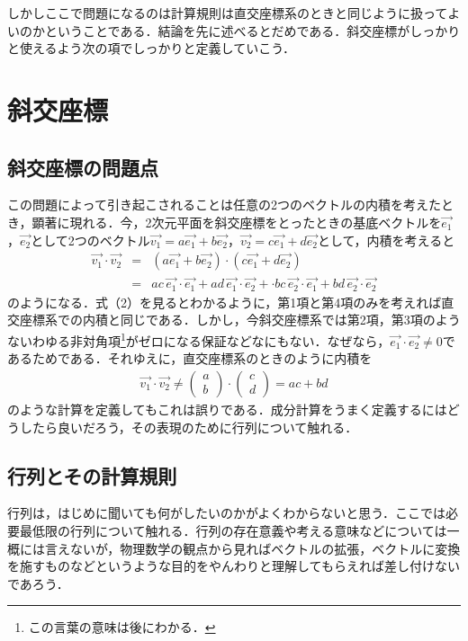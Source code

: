 \documentclass[dvipdfmx,a4]{jsarticle}
\begin{document}
しかしここで問題になるのは計算規則は直交座標系のときと同じように扱ってよいのかということである．結論を先に述べるとだめである．斜交座標がしっかりと使えるよう次の項でしっかりと定義していこう．

\section{斜交座標}
\subsection{斜交座標の問題点}
この問題によって引き起こされることは任意の2つのベクトルの内積を考えたとき，顕著に現れる．今，2次元平面を斜交座標をとったときの基底ベクトルを\(\vec{e_1}\)，\(\vec{e_2}\)として2つのベクトル\(\vec{v_1} = a\vec{e_1} +b\vec{e_2}\)，\(\vec{v_2} = c\vec{e_1} +d\vec{e_2}\)として，内積を考えると
\begin{eqnarray}
  \vec{v_1}\cdot \vec{v_2} 
  &=& \left( a\vec{e_1} +b\vec{e_2} \right)\cdot \left( c\vec{e_1} +d\vec{e_2} \right)\\
  &=& ac \, \vec{e_1} \cdot \vec{e_1} + ad\, \vec{e_1} \cdot \vec{e_2} +\cdot bc\, \vec{e_2} \cdot \vec{e_1} +bd\, \vec{e_2} \cdot \vec{e_2} \label{2}
\end{eqnarray}
のようになる．式（2）を見るとわかるように，第1項と第4項のみを考えれば直交座標系での内積と同じである．しかし，今斜交座標系では第2項，第3項のようないわゆる非対角項\footnote{この言葉の意味は後にわかる．}がゼロになる保証などなにもない．なぜなら，\(\vec{e_1} \cdot \vec{e_2} \neq 0\)であるためである．それゆえに，直交座標系のときのように内積を
\begin{eqnarray}
  \vec{v_1} \cdot \vec{v_2} \not=
  \begin{pmatrix}
    a \\
    b
  \end{pmatrix}
  \cdot 
  \begin{pmatrix}
    c \\
    d
  \end{pmatrix}
  = ac+bd
\end{eqnarray}
のような計算を定義してもこれは誤りである．成分計算をうまく定義するにはどうしたら良いだろう，その表現のために行列について触れる．

\subsection{行列とその計算規則}
行列は，はじめに聞いても何がしたいのかがよくわからないと思う．ここでは必要最低限の行列について触れる．行列の存在意義や考える意味などについては一概には言えないが，物理数学の観点から見ればベクトルの拡張，ベクトルに変換を施すものなどというような目的をやんわりと理解してもらえれば差し付けないであろう．
\end{document}
